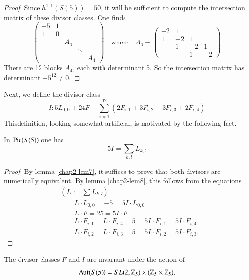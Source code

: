 \begin{proof}
Since $h^{1,1}(S(5))=50$, it will be sufficient to compute the
intersection matrix of these divisor classes. One finds
$$
\begin{pmatrix}
-5 & 1 & & & \\
1 & 0 & &&\\
  &   & A_{4} & &\\
      &&& \ddots\\
 & & & & A_{4}
\end{pmatrix}
\quad\text{where}\quad A_{4}=
\begin{pmatrix}
-2 & 1 & &\\
1 & -2 & 1 & \\
  & 1 & -2 & 1\\
  &   & 1 & -2
\end{pmatrix}
$$
There are 12 blocks $A_{4}$, each with determinant 5. So the
intersection matrix has determinant $-5^{12}\neq 0$.
\end{proof}

Next, we define the divisor class
\begin{equation}
I:5L_{0,0}+24F-\sum^{12}_{i=1}\left(2F_{i,1}+3F_{i,2}+3F_{i,3}+2F_{i,4}\right)\label{chap2-eq22} 
\end{equation}
This\pageoriginale definition, looking somewhat artificial, is
motivated by the following fact.

\begin{lemma}\label{chap2-lem9}
In $\operatorname{Pic}(S(5))$ one has
$$
5I=\sum_{k,l}L_{k,l}
$$
\end{lemma}

\begin{proof}
By lemma \ref{chap2-lem7}, it suffices to prove that both divisors are
numerically equivalent. By lemma \ref{chap2-lem8}, this follows from
the equations
\begin{align*}
& (L:=\sum L_{k,l})\\
&\qquad L\cdot L_{0,0}=-5=5I\cdot L_{0,0}\\
&\qquad L\cdot F=25=5I\cdot F\\
&\qquad L\cdot F_{i,1}=L\cdot F_{i,4}=5=5I\cdot F_{i,1}=5I\cdot
F_{i,4}\\
&\qquad L\cdot F_{i,2}=L\cdot F_{i,3}=5=5I\cdot F_{i,2}=5I\cdot
F_{i,3}.  
\end{align*}
\end{proof}

The divisor classes $F$ and $I$ are invariant under the action of
$$
\operatorname{Aut} (S(5))=SL(2,\mathbb{Z}_{5})\times
(\mathbb{Z}_{5}\times \mathbb{Z}_{5}).
$$ 

